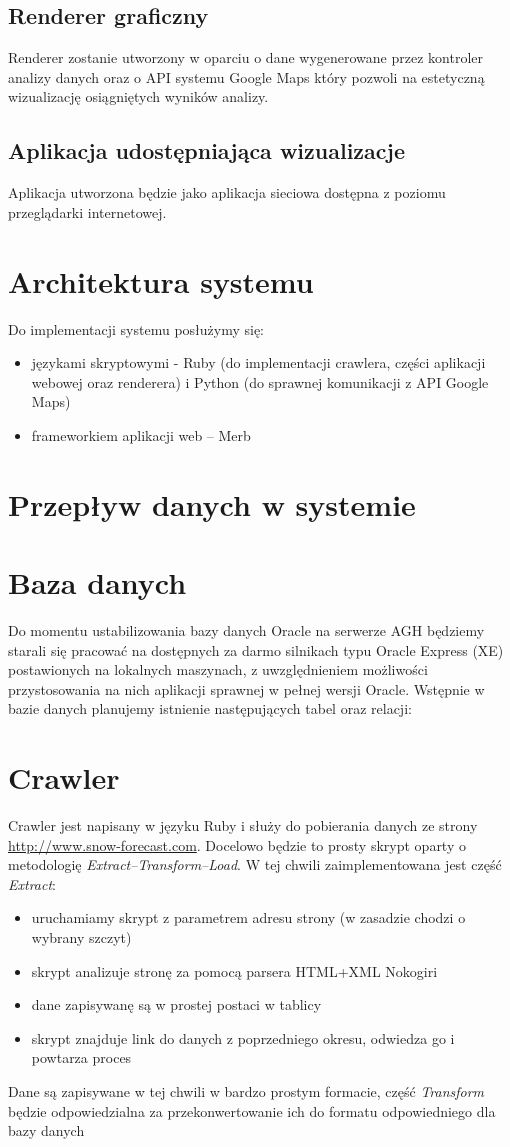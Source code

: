 \documentclass[12pt]{article}
\begin{document}
\subsection{Renderer graficzny}
Renderer zostanie utworzony w oparciu o dane wygenerowane przez kontroler
analizy danych oraz o API systemu Google Maps który pozwoli na estetyczną
wizualizację osiągniętych wyników analizy.

\subsection{Aplikacja udostępniająca wizualizacje}
Aplikacja utworzona będzie jako aplikacja sieciowa dostępna z poziomu
przeglądarki internetowej.

\section{Architektura systemu}

Do implementacji systemu posłużymy się:
\begin{itemize}
\item językami skryptowymi - Ruby (do implementacji crawlera, części aplikacji
    webowej oraz renderera) i Python (do sprawnej komunikacji z API Google
      Maps)
\item frameworkiem aplikacji web -- Merb
\end{itemize}


\section{Przepływ danych w systemie}

\section{Baza danych}
Do momentu ustabilizowania bazy danych Oracle na serwerze AGH będziemy starali
się pracować na dostępnych za darmo silnikach typu Oracle Express (XE)
  postawionych na lokalnych maszynach, z uwzględnieniem możliwości
  przystosowania na nich aplikacji sprawnej w pełnej wersji Oracle. Wstępnie w
  bazie danych planujemy istnienie następujących tabel oraz relacji:

\section{Crawler}
Crawler jest napisany w języku Ruby i służy do pobierania danych ze strony \url{http://www.snow-forecast.com}.
Docelowo będzie to prosty skrypt oparty o metodologię \emph{Extract--Transform--Load}. W tej chwili zaimplementowana
jest część \emph{Extract}:
\begin{itemize}
\item uruchamiamy skrypt z parametrem adresu strony (w zasadzie chodzi o wybrany szczyt)
\item skrypt analizuje stronę za pomocą parsera HTML+XML Nokogiri
\item dane zapisywanę są w prostej postaci w tablicy
\item skrypt znajduje link do danych z poprzedniego okresu, odwiedza go i powtarza proces
\end{itemize}

Dane są zapisywane w tej chwili w bardzo prostym formacie, część \emph{Transform} będzie odpowiedzialna
za przekonwertowanie ich do formatu odpowiedniego dla bazy danych
\end{document}
